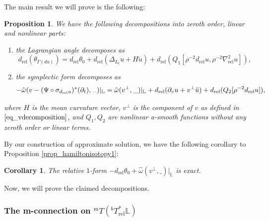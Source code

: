 \documentclass[10pt, a4paper]{article}
\theoremstyle{plain}%
\newtheorem{prop}[theorem]{Proposition}
\newtheorem{coro}[theorem]{Corollary}
\theoremstyle{definition}
\numberwithin{figure}{section}
\numberwithin{equation}{section}
\newcommand{\bL}{\mathbb{L}}
\newcommand{\pa}{\partial}
\newcommand{\dr}{d_\mathrm{rel}}
\newcommand{\tu}{\tilde{u}}
\newcommand{\rel}{\mathrm{rel}}
\newcommand{\m}{\mathrm{m}}
\begin{document}
The main result we will prove is the following:
\begin{prop}
	We have the following decompositions into zeroth order, linear and nonlinear parts:
	\begin{enumerate}
		\item the Lagrangian angle decomposes as  \begin{equation}\label{eq_decomptheta}
			d_\rel(\theta_{\Gamma(du)})= d_{\rel}\theta_0+d_{\rel}\left(\Delta_{L_t} u + H\tu \right) + d_\rel(Q_1[\rho^{-2}d_\rel u, \rho^{-2}\nabla^2_\rel u]),\end{equation}
		
		\item the symplectic form decomposes as\begin{equation}
			-\hat{\omega}(v- {(\Psi\circ \sigma_{\dr u})^*(\partial_t)}, \rule{0.25cm}{0.05mm} )|_{\bL} = \hat{\omega}(v^\perp,\_)|_{\bL} + d_\rel(\pa_vu+v^\perp \tu) +d_\rel(Q_2[\rho^{-2}d_\rel u]),
		\end{equation}
	\end{enumerate} 

	
	where $H$ is the mean curvature vector, $v^\perp$ is the component of $v$ as defined in $\eqref{eq_vdecomposition}$, and $Q_1,Q_2$ are nonlinear a-smooth functions without any zeroth order or linear terms.
\end{prop}


By our construction of approximate solution, we have the following corollary to Proposition \ref{prop_hamiltonisotopy1}:
\begin{coro}
	The relative $1$-form $-d_\rel\theta_0+ \hat{\omega}(v^\perp,\_)|_{\bL}$ is exact.  
\end{coro}


Now, we will prove the claimed decompositions. 


\subsubsection{The m-connection on $^{\m}T(^bT^*_\rel\bL)$}
\end{document}
